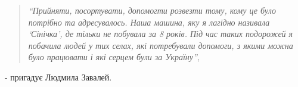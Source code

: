  
 
 
 
 

\begin{quote}
\emph{\enquote{Прийняти, посортувати,  допомогти розвезти тому, кому це було потрібно та
адресувалось. Наша машина, яку я лагідно називала  \enquote{Сінічка}, де тільки не
побувала за 8 років. Під час таких подорожей я побачила людей у тих селах, які
потребували допомоги, з якими можна було працювати і які серцем були за
Україну}}, 
\end{quote}
- пригадує Людмила Завалей.
